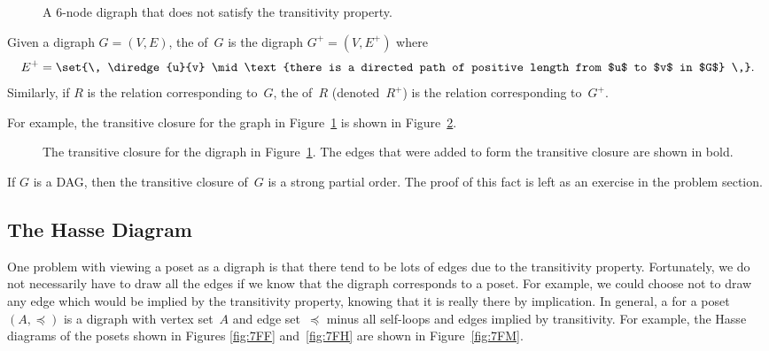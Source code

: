\begin{figure}



\caption{A 6-node digraph that does not satisfy the transitivity
  property.}

\label{fig:7FJ}

\end{figure}

\begin{definition}\label{def:transitive_closure}
Given a digraph $G = (V, E)$, the  of~$G$ is
the digraph $G^+ = (V, E^+)$ where
\begin{equation*}
    E^+ = \set{\, \diredge{u}{v} \mid \text{there is a directed path of
        positive length from $u$ to $v$ in $G$} \,}.
\end{equation*}
Similarly, if $R$ is the relation corresponding to~$G$, the
 of~$R$ (denoted~$R^+$) is the relation
corresponding to~$G^+$.
\end{definition}

For example, the transitive closure for the graph in
Figure~\ref{fig:7FJ} is shown in Figure~\ref{fig:7FK}.

\begin{figure}



\caption{The transitive closure for the digraph in
  Figure~\ref{fig:7FJ}.  The edges that were added to form the
  transitive closure are shown in bold.}

\label{fig:7FK}

\end{figure}

If $G$ is a DAG, then the transitive closure of~$G$ is a strong
partial order.  The proof of this fact is left as an exercise in the
problem section.

\subsection{The Hasse Diagram}

One problem with viewing a poset as a digraph is that there tend to be
lots of edges due to the transitivity property.  Fortunately, we do
not necessarily have to draw all the edges if we know that the digraph
corresponds to a poset.  For example, we could choose not to draw any
edge which would be implied by the transitivity property, knowing that
it is really there by implication.  In general, a 
for a poset~$(A, \preceq)$ is a digraph with vertex set~$A$ and edge
set~$\preceq$ minus all self-loops and edges implied by transitivity.
For example, the Hasse diagrams of the posets shown in Figures
\ref{fig:7FF} and~\ref{fig:7FH} are shown in Figure~\ref{fig:7FM}.

